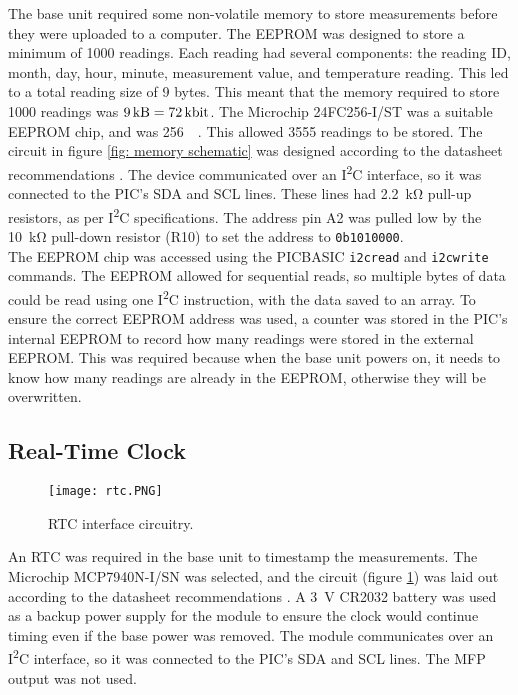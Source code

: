 The base unit required some non-volatile memory to store measurements before they were uploaded to a computer. The EEPROM was designed to store a minimum of 1000 readings. Each reading had several components: the reading ID, month, day, hour, minute, measurement value, and temperature reading. This led to a total reading size of 9 bytes. This meant that the memory required to store 1000 readings was $\SI{9}{\kilo\byte}=\SI{72}{\kilo\bit}$. The Microchip 24FC256-I/ST \cite{memory} was a suitable EEPROM chip, and was \SI{256}{\kilo\bit}. This allowed 3555 readings to be stored. The circuit in figure \ref{fig: memory schematic} was designed according to the datasheet recommendations \cite{memory}. The device communicated over an I\textsuperscript{2}C interface, so it was connected to the PIC's SDA and SCL lines. These lines had \SI{2.2}{\kilo\ohm} pull-up resistors, as per I\textsuperscript{2}C specifications. The address pin A2 was pulled low by the \SI{10}{\kilo\ohm} pull-down resistor (R10) to set the address to \verb|0b1010000|.\\

The EEPROM chip was accessed using the PICBASIC \verb|i2cread| and \verb|i2cwrite| commands. The EEPROM allowed for sequential reads, so multiple bytes of data could be read using one I\textsuperscript{2}C instruction, with the data saved to an array. To ensure the correct EEPROM address was used, a counter was stored in the PIC's internal EEPROM to record how many readings were stored in the external EEPROM. This was required because when the base unit powers on, it needs to know how many readings are already in the EEPROM, otherwise they will be overwritten.





\subsection{Real-Time Clock}
\begin{figure}[htb]
	\centering
	\texttt{[image: rtc.PNG]}
	\caption{RTC interface circuitry.}
	\label{fig: rtc schematic}
\end{figure}

An RTC was required in the base unit to timestamp the measurements. The Microchip MCP7940N-I/SN \cite{rtc} was selected, and the circuit (figure \ref{fig: rtc schematic}) was laid out according to the datasheet recommendations \cite{rtc}. A \SI{3}{\volt} CR2032 battery was used as a backup power supply for the module to ensure the clock would continue timing even if the base power was removed. The module communicates over an I\textsuperscript{2}C interface, so it was connected to the PIC's SDA and SCL lines. The MFP output was not used.





